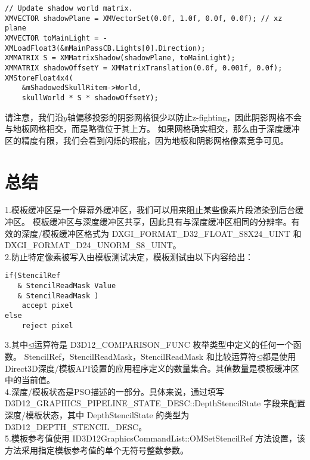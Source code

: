 \begin{lstlisting}
// Update shadow world matrix.
XMVECTOR shadowPlane = XMVectorSet(0.0f, 1.0f, 0.0f, 0.0f); // xz plane
XMVECTOR toMainLight = -XMLoadFloat3(&mMainPassCB.Lights[0].Direction);
XMMATRIX S = XMMatrixShadow(shadowPlane, toMainLight);
XMMATRIX shadowOffsetY = XMMatrixTranslation(0.0f, 0.001f, 0.0f);
XMStoreFloat4x4(
    &mShadowedSkullRitem->World,
    skullWorld * S * shadowOffsetY);
\end{lstlisting}

\begin{flushleft}
请注意，我们沿$y$轴偏移投影的阴影网格很少以防止z-fighting，因此阴影网格不会与地板网格相交，而是略微位于其上方。 如果网格确实相交，那么由于深度缓冲区的精度有限，我们会看到闪烁的瑕疵，因为地板和阴影网格像素竞争可见。
\end{flushleft}

\section{总结}
\begin{flushleft}
1.模板缓冲区是一个屏幕外缓冲区，我们可以用来阻止某些像素片段渲染到后台缓冲区。 模板缓冲区与深度缓冲区共享，因此具有与深度缓冲区相同的分辨率。有效的深度/模板缓冲区格式为 DXGI\_FORMAT\_D32\_FLOAT\_S8X24\_UINT 和 DXGI\_FORMAT\_D24\_UNORM\_S8\_UINT。\\

2.防止特定像素被写入由模板测试决定，模板测试由以下内容给出：\\
\end{flushleft}

\begin{lstlisting}
if(StencilRef 
   & StencilReadMask Value 
   & StencilReadMask )
    accept pixel
else
    reject pixel
\end{lstlisting}

\begin{flushleft}
3.其中$\unlhd$运算符是 D3D12\_COMPARISON\_FUNC 枚举类型中定义的任何一个函数。 StencilRef，StencilReadMask，StencilReadMask 和比较运算符$\unlhd$都是使用Direct3D深度/模板API设置的应用程序定义的数量集合。其值数量是模板缓冲区中的当前值。\\
4.深度/模板状态是PSO描述的一部分。具体来说，通过填写 D3D12\_GRAPHICS\_PIPELINE\_STATE\_DESC::DepthStencilState 字段来配置深度/模板状态，其中 DepthStencilState 的类型为 D3D12\_DEPTH\_STENCIL\_DESC。\\
5.模板参考值使用 ID3D12GraphicsCommandList::OMSetStencilRef 方法设置，该方法采用指定模板参考值的单个无符号整数参数。\\
\end{flushleft}



